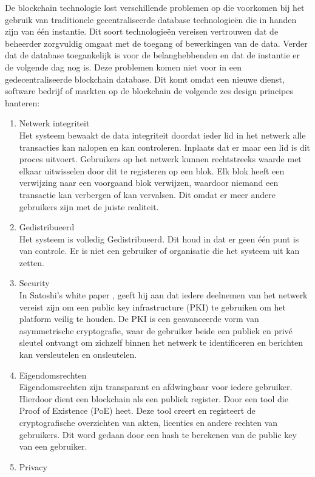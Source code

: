 De blockchain technologie lost verschillende problemen op die voorkomen bij het gebruik van traditionele gecentraliseerde database technologieën die in handen zijn van één instantie. Dit soort technologieën vereisen vertrouwen dat de beheerder zorgvuldig omgaat met de toegang of bewerkingen van de data. Verder dat de database toegankelijk is voor de belanghebbenden en dat de instantie er de volgende dag nog is. Deze problemen komen niet voor in een gedecentraliseerde blockchain database. Dit komt omdat een nieuwe dienst, software bedrijf of markten op de blockchain de volgende zes design principes \cite{blockRev} hanteren:
\begin{enumerate}
	\item Netwerk integriteit\\
	Het systeem bewaakt de data integriteit doordat ieder lid in het netwerk alle transacties kan nalopen en kan controleren. Inplaats dat er maar een lid is dit proces uitvoert. Gebruikers op het netwerk kunnen rechtstreeks waarde met elkaar uitwisselen door dit te registeren op een blok. Elk blok heeft een verwijzing naar een voorgaand blok verwijzen, waardoor niemand een transactie kan verbergen of kan vervalsen. Dit omdat er meer andere gebruikers zijn met de juiste realiteit.
	\item Gedistribueerd\\
	Het systeem is volledig Gedistribueerd. Dit houd in dat er geen één punt is van controle. Er is niet een gebruiker of organisatie die het systeem uit kan zetten.
	\item Security\\
	In Satoshi’s white paper \cite{bitcoinPaper}, geeft hij aan dat iedere deelnemen van het netwerk vereist zijn om een public key infrastructure (PKI) te gebruiken om het platform veilig te houden. De PKI is een geavanceerde vorm van asymmetrische cryptografie, waar de gebruiker beide een publiek en privé sleutel ontvangt om zichzelf binnen het netwerk te identificeren en berichten kan versleutelen en onsleutelen.
	\item Eigendomsrechten\\
	Eigendomsrechten zijn transparant en afdwingbaar voor iedere gebruiker. Hierdoor dient een blockchain als een publiek register. Door een tool die Proof of Existence (PoE) heet. Deze tool creert en registeert de cryptografische overzichten van akten, licenties en andere rechten van gebruikers. Dit word gedaan door een hash te berekenen van de public key van een gebruiker.
	\item Privacy\\

\end{enumerate}
